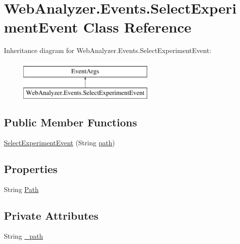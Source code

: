 \hypertarget{class_web_analyzer_1_1_events_1_1_select_experiment_event}{}\section{Web\+Analyzer.\+Events.\+Select\+Experiment\+Event Class Reference}
\label{class_web_analyzer_1_1_events_1_1_select_experiment_event}
Inheritance diagram for Web\+Analyzer.\+Events.\+Select\+Experiment\+Event\+:\begin{figure}[H]
\begin{center}
\leavevmode
\includegraphics[height=2.000000cm]{class_web_analyzer_1_1_events_1_1_select_experiment_event}
\end{center}
\end{figure}
\subsection*{Public Member Functions}
\begin{DoxyCompactItemize}
\item 
\hyperlink{class_web_analyzer_1_1_events_1_1_select_experiment_event_afee7e3e19fb7c79418750e617d242585}{Select\+Experiment\+Event} (String \hyperlink{bin_2x64_2_release_2_u_i_2_h_t_m_l_resources_2js_2src_2create__experiment_8js_aa72e0c8a20e6bcc571d3a1c51846e627}{path})
\end{DoxyCompactItemize}
\subsection*{Properties}
\begin{DoxyCompactItemize}
\item 
String \hyperlink{class_web_analyzer_1_1_events_1_1_select_experiment_event_a7c9d614ac51f5dadaba4f5dd5e38c9d3}{Path}
\end{DoxyCompactItemize}
\subsection*{Private Attributes}
\begin{DoxyCompactItemize}
\item 
String \hyperlink{class_web_analyzer_1_1_events_1_1_select_experiment_event_a8bf3d855a5562c63c3d4f1a028f05b20}{\+\_\+path}
\end{DoxyCompactItemize}



